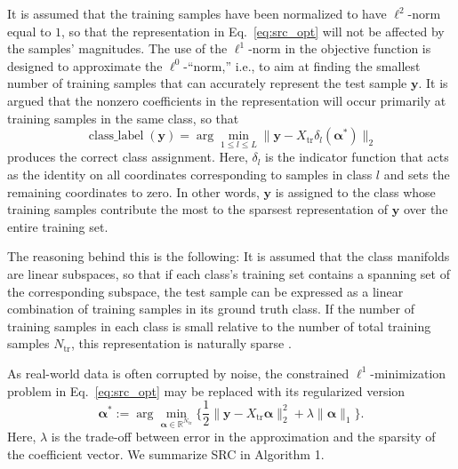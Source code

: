 \documentclass[review]{elsarticle}
\newcommand{\classlabel}{\operatorname{class\_label}}
\begin{document}
It is assumed that the training samples have been normalized to have $\ell^2$-norm equal to $1$, so that the representation in Eq.~\eqref{eq:src_opt} will not be affected by the samples' magnitudes. The use of the $\ell^1$-norm in the objective function is designed to approximate the $\ell^0$-``norm,'' i.e., to aim at finding the smallest number of training samples that can accurately represent the test sample $\bm{y}$. It is argued that the nonzero coefficients in the representation will occur primarily at training samples in the same class, so that
\begin{equation} \label{eq:src_class}
\classlabel(\bm{y}) = \arg \min_{1\leq l \leq L} \big\|\bm{y} - X_\mathrm{tr}\delta_l(\bm{\alpha}^*)\big\|_2
\end{equation}
produces the correct class assignment. Here, $\delta_l$ is the indicator function that acts as the identity on all coordinates corresponding to samples in class $l$ and sets the remaining coordinates to zero. In other words, $\bm{y}$ is assigned to the class whose training samples contribute the most to the sparsest representation of $\bm{y}$ over the entire training set.

The reasoning behind this is the following: It is assumed that the class manifolds are linear subspaces, so that if each class's training set contains a spanning set of the corresponding subspace, the test sample can be expressed as a linear combination of training samples in its ground truth class. If the number of training samples in each class is small relative to the number of total training samples $N_\mathrm{tr}$, this representation is naturally sparse \cite{wri:src}. 

As real-world data is often corrupted by noise, the constrained $\ell^1$-minimization problem in Eq.~\eqref{eq:src_opt} may be replaced with its regularized version
\begin{equation} \label{eq:src_opt_noise}
\bm{\alpha}^* := \arg \min_{\bm{\alpha}\in \mathbb{R}^{N_\mathrm{tr}}} \Big \{\frac{1}{2} \|\bm{y}-X_\mathrm{tr}\bm{\alpha}\|_2^2 + \lambda\|\bm{\alpha}\|_1\Big \}.
\end{equation}
Here, $\lambda$ is the trade-off between error in the approximation and the sparsity of the coefficient vector. We summarize SRC in Algorithm 1.
\end{document}
